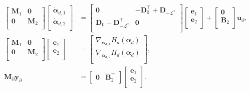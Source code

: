 \begin{equation}\label{eq:pHsys_findim_J2}
\begin{aligned}
\begin{bmatrix}
\mathbf{M}_1 & \mathbf{0} \\
\mathbf{0} & \mathbf{M}_2 \\
\end{bmatrix}
\begin{bmatrix}
\dot{\bm{\alpha}}_{d, 1} \\
\dot{\bm{\alpha}}_{d, 2} \\
\end{bmatrix}
&= \begin{bmatrix}
\mathbf{0} & -\mathbf{D}_{0}^\top + \mathbf{D}_{-\mathcal{L}^*} \\
\mathbf{D}_{0} - \mathbf{D}_{-\mathcal{L}^*}^\top & \mathbf{0} \\
\end{bmatrix} 
\begin{bmatrix}
\mathbf{e}_{1} \\
\mathbf{e}_{2} \\
\end{bmatrix} + 
\begin{bmatrix}
\mathbf{0}\\
\mathbf{B}_2\\
\end{bmatrix}
\mathbf{u}_\partial, \\
\begin{bmatrix}
\mathbf{M}_1 & \mathbf{0} \\
\mathbf{0} & \mathbf{M}_2 \\
\end{bmatrix}
\begin{bmatrix}
\mathbf{e}_{1} \\
\mathbf{e}_{2} \\
\end{bmatrix}
&= \begin{bmatrix}
\nabla_{\bm{\alpha}_{d, 1}} H_d(\bm{\alpha}_d)\\
\nabla_{\bm{\alpha}_{d, 2}} H_d(\bm{\alpha}_d)\\
\end{bmatrix}, \\
\mathbf{M}_\partial {\mathbf{y}_\partial} &= 
\begin{bmatrix}
\mathbf{0} & \mathbf{B}_2^\top 
\end{bmatrix}\begin{bmatrix}
\mathbf{e}_{1} \\
\mathbf{e}_{2} \\
\end{bmatrix}.
\end{aligned}
\end{equation}

